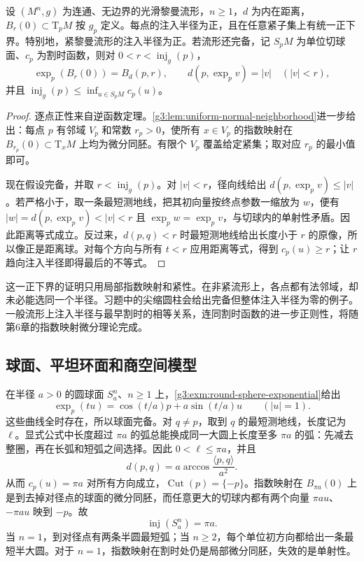 \begin{proposition}\label{g3:prop:compact-injectivity-lower-bound}
	设 \((M^n,g)\) 为连通、无边界的光滑黎曼流形，\(n\ge1\)，\(d\) 为内在距离，\(B_r(0)\subset\mathrm T_pM\) 按 \(g_p\) 定义。每点的注入半径为正，且在任意紧子集上有统一正下界。特别地，紧黎曼流形的注入半径为正。若流形还完备，记 \(S_pM\) 为单位切球面、\(c_p\) 为割时函数，则对 \(0<r<\operatorname{inj}_g(p)\)，
	\[
		\exp_p(B_r(0))=B_d(p,r),\qquad
		d(p,\exp_p v)=|v|\quad(|v|<r),
	\]
	并且 \(\operatorname{inj}_g(p)\le\inf_{u\in S_pM}c_p(u)\)。
\end{proposition}
\begin{proof}
	逐点正性来自逆函数定理。\cref{g3:lem:uniform-normal-neighborhood}进一步给出：每点 \(p\) 有邻域 \(V_p\) 和常数 \(r_p>0\)，使所有 \(x\in V_p\) 的指数映射在 \(B_{r_p}(0)\subset \mathrm{T}_xM\) 上均为微分同胚。有限个 \(V_p\) 覆盖给定紧集；取对应 \(r_p\) 的最小值即可。

	现在假设完备，并取 \(r<\operatorname{inj}_g(p)\)。对 \(|v|<r\)，径向线给出 \(d(p,\exp_pv)\le|v|\)。若严格小于，取一条最短测地线，把其初向量按终点参数一缩放为 \(w\)，便有 \(|w|=d(p,\exp_pv)<|v|<r\) 且 \(\exp_pw=\exp_pv\)，与切球内的单射性矛盾。因此距离等式成立。反过来，\(d(p,q)<r\) 时最短测地线给出长度小于 \(r\) 的原像，所以像正是距离球。对每个方向与所有 \(t<r\) 应用距离等式，得到 \(c_p(u)\ge r\)；让 \(r\) 趋向注入半径即得最后的不等式。
\end{proof}

这一正下界的证明只用局部指数映射和紧性。在非紧流形上，各点都有法邻域，却未必能选同一个半径。习题中的尖缩圆柱会给出完备但整体注入半径为零的例子。一般流形上注入半径与最早割时的相等关系，连同割时函数的进一步正则性，将随第6章的指数映射微分理论完成。

\subsection{球面、平坦环面和商空间模型}
\label{g3:subsec:0204:04}
\begin{example}\label{g3:exm:sphere-cut-locus}
	在半径 \(a>0\) 的圆球面 \(S_a^n\)、\(n\ge1\) 上，\cref{g3:exm:round-sphere-exponential}给出
	\[
		\exp_p(tu)=\cos(t/a)p+a\sin(t/a)u\qquad(|u|=1).
	\]
	这些曲线全时存在，所以球面完备。对 \(q\ne p\)，取到 \(q\) 的最短测地线，长度记为 \(\ell\)。显式公式中长度超过 \(\pi a\) 的弧总能换成同一大圆上长度至多 \(\pi a\) 的弧：先减去整圈，再在长弧和短弧之间选择。因此 \(0<\ell\le\pi a\)，并且
	\[
		d(p,q)=a\arccos\frac{\langle p,q\rangle}{a^2}.
	\]
	从而 \(c_p(u)=\pi a\) 对所有方向成立，\(\operatorname{Cut}(p)=\{-p\}\)。指数映射在 \(B_{\pi a}(0)\) 上是到去掉对径点的球面的微分同胚，而任意更大的切球内都有两个向量 \(\pi a u\)、\(-\pi a u\) 映到 \(-p\)。故
	\[
		\operatorname{inj}(S_a^n)=\pi a.
	\]
	当 \(n=1\)，到对径点有两条半圆最短弧；当 \(n\ge2\)，每个单位初方向都给出一条最短半大圆。对于 \(n=1\)，指数映射在割时处仍是局部微分同胚，失效的是单射性。
\end{example}

